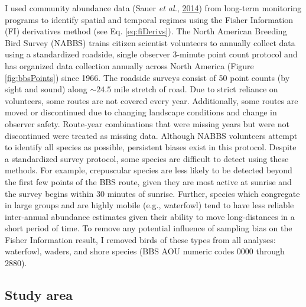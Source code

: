\documentclass[print]{nuthesis}
\begin{document}
I used community abundance data (Sauer \emph{et al.}, \protect\hyperlink{ref-sauer2017results}{2014}) from long-term monitoring programs to identify spatial and temporal regimes using the Fisher Information (FI) derivatives method (see Eq. \eqref{eq:fiDerivs}). The North American Breeding Bird Survey (NABBS) trains citizen scientist volunteers to annually collect data using a standardized roadside, single observer 3-minute point count protocol and has organized data collection annually across North America (Figure \ref{fig:bbsPoints}) since 1966. The roadside surveys consist of 50 point counts (by sight and sound) along \(\sim24.5\) mile stretch of road. Due to strict reliance on volunteers, some routes are not covered every year. Additionally, some routes are moved or discontinued due to changing landscape conditions and change in observer safety. Route-year combinations that were missing years but were not discontinued were treated as missing data. Although NABBS volunteers attempt to identify all species as possible, persistent biases exist in this protocol. Despite a standardized survey protocol, some species are difficult to detect using these methods. For example, crepuscular species are less likely to be detected beyond the first few points of the BBS route, given they are most active at sunrise and the survey begins within 30 minutes of sunrise. Further, species which congregate in large groups and are highly mobile (e.g., waterfowl) tend to have less reliable inter-annual abundance estimates given their ability to move long-distances in a short period of time. To remove any potential influence of sampling bias on the Fisher Information result, I removed birds of these types from all analyses: waterfowl, waders, and shore species (BBS AOU numeric codes 0000 through 2880).

\hypertarget{study-area}{%
\subsection{Study area}\label{study-area}}
\end{document}
